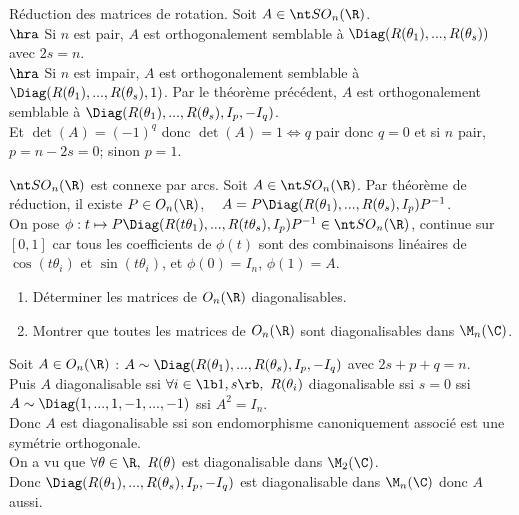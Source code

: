 \documentclass[11pt]{article}
\begin{document}
\vspace*{-0.5cm}

\begin{corr}{Réduction des matrices de rotation.}{}
    Soit $A\in\SO_n(\R)$.\\
    $\hra$ Si $n$ est pair, $A$ est orthogonalement semblable à $\Diag(R(\theta_1),...,R(\theta_s))$ avec $2s=n$.\\
    $\hra$ Si $n$ est impair, $A$ est orthogonalement semblable à $\Diag(R(\theta_1),...,R(\theta_s),1)$.
    \tcblower
    Par le théorème précédent, $A$ est orthogonalement semblable à $\Diag(R(\theta_1),...,R(\theta_s),I_p,-I_q)$.\\
    Et $\det(A)=(-1)^q$ donc $\det(A)=1\iff q$ pair donc $q=0$ et si $n$ pair, $p=n-2s=0$; sinon $p=1$.
\end{corr}

\begin{prop}{}{}
    $\SO_n(\R)$ est connexe par arcs.
    \tcblower
    Soit $A\in\SO_n(\R)$. Par théorème de réduction, il existe $P\in O_n(\R)$, ~ $A=P\Diag(R(\theta_1),...,R(\theta_s),I_p)P^{-1}$.\\
    On pose $\phi:t\mapsto P\Diag(R(t\theta_1),...,R(t\theta_s),I_p)P^{-1}\in\SO_n(\R)$, continue sur $[0,1]$ car tous les coefficients de $\phi(t)$ sont des combinaisons linéaires de $\cos(t\theta_i)$ et $\sin(t\theta_i)$, et $\phi(0)=I_n$, $\phi(1)=A$.
\end{prop}

\begin{ex}{}{}
    \begin{enumerate}
        \item Déterminer les matrices de $O_n(\R)$ diagonalisables.
        \item Montrer que toutes les matrices de $O_n(\R)$ sont diagonalisables dans $\M_n(\C)$.
    \end{enumerate}
    \tcblower
     Soit $A\in O_n(\R)$ : $A\sim \Diag(R(\theta_1),...,R(\theta_s),I_p,-I_q)$ avec $2s+p+q=n$.\\
    Puis $A$ diagonalisable ssi $\forall i \in \lb1,s\rb, ~ R(\theta_i)$ diagonalisable ssi $s=0$ ssi $A\sim\Diag(1,...,1,-1,...,-1)$ ssi $A^2=I_n$.\\
    Donc $A$ est diagonalisable ssi son endomorphisme canoniquement associé est une symétrie orthogonale.\\
     On a vu que $\forall \theta \in\R, ~ R(\theta)$ est diagonalisable dans $\M_2(\C)$.\\
    Donc $\Diag(R(\theta_1),...,R(\theta_s),I_p,-I_q)$ est diagonalisable dans $\M_n(\C)$ donc $A$ aussi.
\end{ex}
\end{document}
